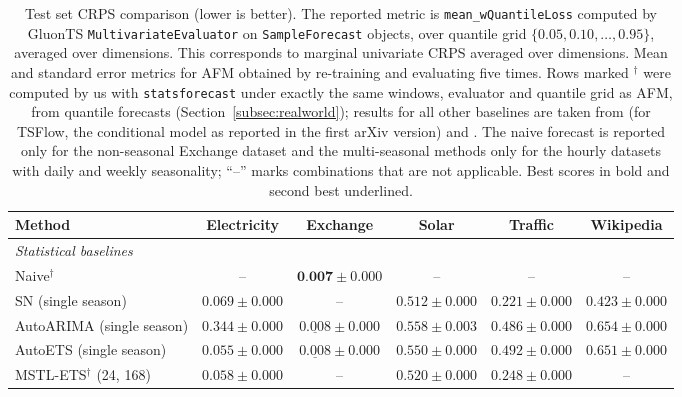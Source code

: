 \documentclass[preprint,12pt,authoryear]{elsarticle}
\newcommand{\oldrev}[1]{#1}
\newcommand{\rev}[1]{#1}
\newcommand{\rev}[1]{\textcolor{blue}{#1}}
\begin{document}
\begin{table}[!tbp]
  \centering
  \setlength{\tabcolsep}{4pt}
  \caption{\oldrev{Test set CRPS comparison (lower is better). The reported metric is \texttt{mean\_wQuantileLoss} computed by GluonTS \texttt{MultivariateEvaluator} on \texttt{SampleForecast} objects, over quantile grid $\{0.05, 0.10, \ldots, 0.95\}$, averaged over dimensions. This corresponds to marginal univariate CRPS averaged over dimensions.} Mean and standard error metrics for AFM obtained by re-training and evaluating five times. \rev{Rows marked $^\dagger$ were computed by us with \texttt{statsforecast} under exactly the same windows, evaluator and quantile grid as AFM, from quantile forecasts (Section~\ref{subsec:realworld}); results for all other baselines are taken from \citet{Kerrigan2024Flow} (for TSFlow, the conditional model as reported in the first arXiv version) and \citet{rasul2021autoregressive}. The naive forecast is reported only for the non-seasonal Exchange dataset and the multi-seasonal methods only for the hourly datasets with daily and weekly seasonality; ``--'' marks combinations that are not applicable.} \oldrev{Best scores in bold and second best underlined.}}
  \label{tab:forecasting}
\begin{adjustbox}{max width=\textwidth}
\begin{small}
  \begin{tabular}{lccccc}
    \toprule
    Method & Electricity & Exchange & Solar & Traffic & Wikipedia \\
    \midrule
    \multicolumn{6}{l}{\textit{Statistical baselines}} \\
    \rev{Naive$^\dagger$}                 & -- & \rev{$\textbf{0.007} \pm 0.000$} & -- & -- & -- \\
    SN \rev{(single season)}              & \rev{$0.069 \pm 0.000$} & \rev{--} & $0.512 \pm 0.000$ & $0.221 \pm 0.000$ & $0.423 \pm 0.000$ \\
    \oldrev{AutoARIMA} \rev{(single season)} & $0.344 \pm 0.000$ & \rev{$\underline{0.008} \pm 0.000$} & $0.558 \pm 0.003$ & $0.486 \pm 0.000$ & $0.654 \pm 0.000$ \\
    \oldrev{AutoETS} \rev{(single season)}   & \rev{$0.055 \pm 0.000$} & \rev{$\underline{0.008} \pm 0.000$} & $0.550 \pm 0.000$ & $0.492 \pm 0.000$ & $0.651 \pm 0.000$ \\
    \rev{MSTL-ETS$^\dagger$ (24, 168)}    & \rev{$0.058 \pm 0.000$} & -- & \rev{$0.520 \pm 0.000$} & \rev{$0.248 \pm 0.000$} & -- \\

\end{tabular}
\end{small}
\end{adjustbox}
\end{table}
\end{document}
